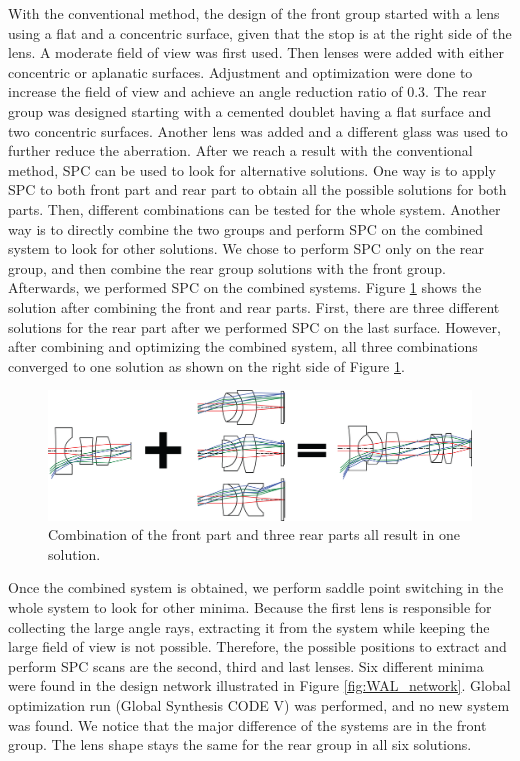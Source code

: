 With the conventional method, the design of the front group started with a lens using a flat and a concentric surface, given that the stop is at the right side of the lens. A moderate field of view was first used. Then lenses were added with either concentric or aplanatic surfaces. Adjustment and optimization were done to increase the field of view and achieve an angle reduction ratio of 0.3. The rear group was designed starting with a cemented doublet having a flat surface and two concentric surfaces. Another lens was added and a different glass was used to further reduce the aberration. 
After we reach a result with the conventional method, SPC can be used to look for alternative solutions. One way is to apply SPC to both front part and rear part to obtain all the possible solutions for both parts. Then, different combinations can be tested for the whole system. Another way is to directly combine the two groups and perform SPC on the combined system to look for other solutions. We chose to perform SPC only on the rear group, and then combine the rear group solutions with the front group. Afterwards, we performed SPC on the combined systems.
Figure \ref{fig:WAL_combine} shows the solution after combining the front and rear parts. First, there are three different solutions for the rear part after we performed SPC on the last surface. However, after combining and optimizing the combined system, all three combinations converged to one solution as shown on the right side of Figure \ref{fig:WAL_combine}. 

\begin{figure}[h!]
    \centering
    \includegraphics[width=\textwidth]{chapter-4/figures/WAL_combine.png}
    \caption{Combination of the front part and three rear parts all result in one solution.}
    \label{fig:WAL_combine}
\end{figure}

Once the combined system is obtained, we perform saddle point switching in the whole system to look for other minima. Because the first lens is responsible for collecting the large angle rays, extracting it from the system while keeping the large field of view is not possible. Therefore, the possible positions to extract and perform SPC scans are the second, third and last lenses. Six different minima were found in the design network illustrated in Figure \ref{fig:WAL_network}. Global optimization run (Global Synthesis CODE V) was performed, and no new system was found. We notice that the major difference of the systems are in the front group. The lens shape stays the same for the rear group in all six solutions.

